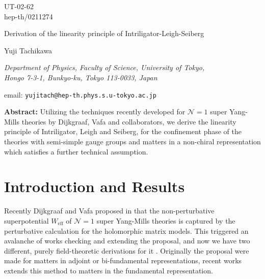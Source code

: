 \documentclass[a4paper,12pt]{article}
\def\W#1{W_{\text{#1}}}
\def\Nis{\mathcal{N}=}
\begin{document}
\thispagestyle{empty}
\hbox{}

\begin{flushright}
UT-02-62\\
hep-th/0211274
\end{flushright}

\bigskip\bigskip\bigskip
\bigskip\bigskip\bigskip

\begin{center}
\LARGE

Derivation of the linearity principle
of Intriligator-Leigh-Seiberg

\bigskip

{\Large
Yuji Tachikawa}\\

\normalsize
\bigskip

\textit{
Department of Physics, Faculty of Science, University of Tokyo,\\
Hongo 7-3-1, Bunkyo-ku, Tokyo 113-0033, Japan}

\bigskip

email: \texttt{yujitach@hep-th.phys.s.u-tokyo.ac.jp}
\end{center}

\textbf{Abstract:}
Utilizing the techniques recently developed
for $\Nis1$ super Yang-Mills theories
by Dijkgraaf, Vafa and collaborators, 
we derive the linearity principle of Intriligator, Leigh and Seiberg,
for the confinement phase of the theories
with semi-simple gauge groups and matters in a non-chiral representation
which satisfies a further technical assumption.


\newpage\setcounter{page}{1}
\section{Introduction and Results}
Recently Dijkgraaf and Vafa proposed
in \cite{Dijkgraaf:2002dh}
that the non-perturbative superpotential $\W{eff}$ of
$\Nis1$ super Yang-Mills theories is captured by
the perturbative calculation for the holomorphic matrix models.
This triggered an avalanche of works \cite{CHECKS} checking 
and extending the proposal, and now we have two different,
purely field-theoretic
derivations for it \cite{Dijkgraaf:2002xd} \cite{Cachazo:2002ry}.
Originally the proposal were made for matters in adjoint or bi-fundamental
representations, recent works \cite{Flavors} extends this method
to matters in the fundamental representation.
\end{document}
